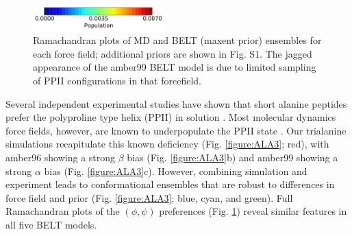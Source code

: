 \documentclass[11pt,titlepage]{article}
\begin{document}
\begin{figure}
\includegraphics[width=5.05cm]{figures/ALA3_rama_colorbar.pdf}


\caption{
Ramachandran plots of MD and BELT (maxent prior) ensembles for each force field; additional priors are shown in Fig. S1.  The jagged appearance of the amber99 BELT model is due to limited sampling of PPII configurations in that forcefield.  
}
\label{figure:Rama}
\end{figure}

Several independent experimental studies have shown that short alanine peptides prefer the polyproline type helix (PPII) in solution  \citep{Grdadolnik2011, Graf2007, Avbelj2006}.  Most molecular dynamics force fields, however, are known to underpopulate the PPII state  \citep{Graf2007,beauchamp2012protein,Nerenberg2011, Best2008}.  Our trialanine simulations recapitulate this known deficiency (Fig. \ref{figure:ALA3}; red), with amber96 showing a strong $\beta$ bias (Fig. \ref{figure:ALA3}b) and amber99 showing a strong $\alpha$ bias (Fig. \ref{figure:ALA3}c).  However, combining simulation and experiment leads to conformational ensembles that are robust to differences in force field and prior (Fig. \ref{figure:ALA3}; blue, cyan, and green).  Full Ramachandran plots of the $(\phi, \psi)$ preferences (Fig. \ref{figure:Rama}) reveal similar features in all five BELT models.  
\end{document}
